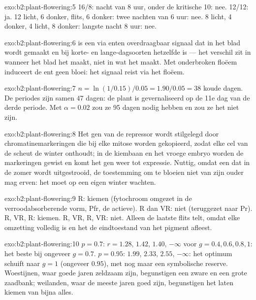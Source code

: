 \begin{solution}{exo:b2:plant-flowering:5}
16/8: nacht van 8 uur, onder de kritische 10: nee. 12/12: ja.
12 licht, 6 donker, flits, 6 donker: twee nachten van 6 uur: nee.
8 licht, 4 donker, 4 licht, 8 donker: langste nacht 8 uur: nee.
\end{solution}

\begin{solution}{exo:b2:plant-flowering:6}
 is een via enten overdraagbaar signaal dat in het blad wordt
gemaakt en bij korte- en lange-dagsoorten hetzelfde is --- het verschil zit
in wanneer het blad het maakt, niet in wat het maakt. Met onderbroken floëem
induceert de ent geen bloei: het signaal reist via het floëem.
\end{solution}

\begin{solution}{exo:b2:plant-flowering:7}
$n = \ln(1/0.15)/0.05 = 1.90/0.05 = 38$ koude dagen. De periodes zijn samen
$47$ dagen: de plant is gevernaliseerd op de 11e dag van de derde periode.
Met $\alpha = 0.02$ zou ze 95 dagen nodig hebben en zou ze het niet zijn.
\end{solution}

\begin{solution}{exo:b2:plant-flowering:8}
Het gen van de repressor wordt stilgelegd door chromatinemarkeringen die bij
elke mitose worden gekopieerd, zodat elke cel van de scheut de winter
onthoudt; in de kiembaan en het vroege embryo worden de markeringen gewist en
komt het gen weer tot expressie. Nuttig, omdat een  dat in de zomer
wordt uitgestrooid, de toestemming om te bloeien niet van zijn ouder mag
erven: het moet op een eigen winter wachten.
\end{solution}

\begin{solution}{exo:b2:plant-flowering:9}
R: kiemen (fytochroom omgezet in de verroodabsorberende vorm, Pfr, de
actieve). R dan VR: niet (teruggezet naar Pr). R, VR, R: kiemen. R, VR, R,
VR: niet. Alleen de laatste flits telt, omdat elke omzetting volledig is en
het  de eindtoestand van het pigment afleest.
\end{solution}

\begin{solution}{exo:b2:plant-flowering:10}
$p = 0.7$: $r = 1.28$, $1.42$, $1.40$, $-\infty$ voor $g = 0.4, 0.6, 0.8,
1$: het beste bij ongeveer $g = 0.7$. $p = 0.95$: $1.99$, $2.33$, $2.55$,
$-\infty$: het optimum schuift naar $g = 1$ (ongeveer $0.95$), met nog maar
een symbolische reserve. Woestijnen, waar goede jaren zeldzaam zijn,
begunstigen een zware  en een grote zaadbank; weilanden, waar de
meeste jaren goed zijn, begunstigen het laten kiemen van bijna alles.
\end{solution}

